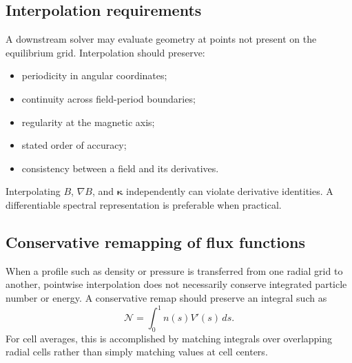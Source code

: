 \subsection{Interpolation requirements}
A downstream solver may evaluate geometry at points not present on the equilibrium grid. Interpolation should preserve:
\begin{itemize}[leftmargin=1.6em]
\item periodicity in angular coordinates;
\item continuity across field-period boundaries;
\item regularity at the magnetic axis;
\item stated order of accuracy;
\item consistency between a field and its derivatives.
\end{itemize}
Interpolating $B$, $\nabla B$, and $\boldsymbol\kappa$ independently can violate derivative identities. A differentiable spectral representation is preferable when practical.

\subsection{Conservative remapping of flux functions}
When a profile such as density or pressure is transferred from one radial grid to another, pointwise interpolation does not necessarily conserve integrated particle number or energy. A conservative remap should preserve an integral such as
\begin{equation}
\mathcal N
=\int_0^1 n(s)V'(s)\,ds.
\label{eq:particle_integral}
\end{equation}
For cell averages, this is accomplished by matching integrals over overlapping radial cells rather than simply matching values at cell centers.


